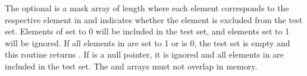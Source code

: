 \begin{apidefinition}
{    The optional  is a mask array of length  where each
    element corresponds to the respective element in  and indicates
    whether the element is excluded from the test set.  Elements of
     set to 0 will be included in the test set, and elements set to
    1 will be ignored.  If all elements in  are set to 1 or
     is 0, the test set is empty and this routine returns
    .  If  is a null pointer, it is ignored and
    all elements in  are included in the test set.  The 
    and  arrays must not overlap in memory.
}




\end{apidefinition}
